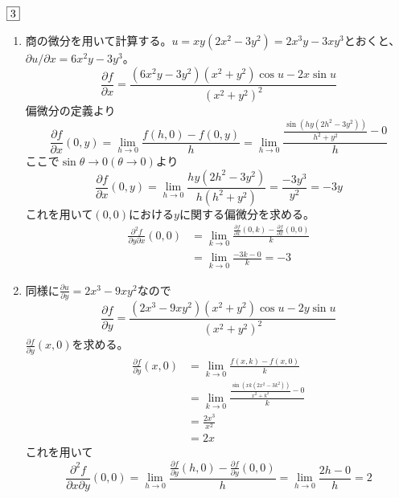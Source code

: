 \documentclass[dvipdfmx]{jsreport}
\begin{document}
\begin{souanswer} %
	$\fbox{3}$
\begin{enumerate}
	\item 商の微分を用いて計算する。$u= xy(2x^2- 3y^2)= 2x^3y- 3xy^3$とおくと、$\partial u/\partial x= 6x^2y- 3y^3$。
\begin{equation*}
	\frac{\partial f}{\partial x}= \frac{(6x^2y- 3y^2)(x^2+ y^2)\cos{u}- 2x\sin{u}}{(x^2+ y^2)^2}
\end{equation*}
	偏微分の定義より
\begin{equation*}
	\frac{\partial f}{\partial x}(0, y)= \lim_{h\to 0} \frac{f(h, 0)- f(0, y)}{h}= \lim_{h\to 0} \frac{\frac{\sin{(hy(2h^2- 3y^2))}}{h^2+ y^2}- 0}{h}
\end{equation*}
	ここで$\sin{\theta}\to 0(\theta\to 0)$より
\begin{equation*}
	\frac{\partial f}{\partial x}(0, y)= \lim_{h\to 0} \frac{hy(2h^2- 3y^2)}{h(h^2+ y^2)}= \frac{-3y^3}{y^2}= -3y
\end{equation*}
	これを用いて$(0, 0)$における$y$に関する偏微分を求める。
\begin{align*}
	\frac{\partial^2 f}{\partial y\partial x}(0, 0)
	&= \lim_{k\to 0} \frac{\frac{\partial f}{\partial x}(0, k)- \frac{\partial f}{\partial x}(0, 0)}{k}\\
	&=\lim_{k\to 0} \frac{-3k- 0}{k}= -3
\end{align*}

	\item 同様に$\frac{\partial u}{\partial y}= 2x^3-9xy^2$なので
\begin{equation*}
	\frac{\partial f}{\partial y}= \frac{(2x^3- 9xy^2)(x^2+ y^2)\cos{u}- 2y\sin{u}}{(x^2+ y^2)^2}
\end{equation*}
	$\frac{\partial f}{\partial y}(x, 0)$を求める。
\begin{align*}
	\frac{\partial f}{\partial y}(x, 0)
	&= \lim_{k\to 0} \frac{f(x, k)- f(x, 0)}{k}\\
	&= \lim_{k\to 0} \frac{\frac{\sin(xk(2x^2- 3k^2))}{x^2+ k^2}- 0}{k}\\
	&= \frac{2x^3}{x^2}\\
	&= 2x
\end{align*}
	これを用いて
\begin{equation*}
	\frac{\partial^2 f}{\partial x\partial y}(0, 0)= \lim_{h\to 0} \frac{\frac{\partial f}{\partial y}(h, 0)- \frac{\partial f}{\partial y}(0, 0)}{h}= \lim_{h\to 0} \frac{2h- 0}{h}= 2
\end{equation*}


\end{enumerate}
\end{souanswer}
\end{document}

